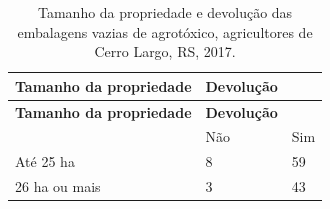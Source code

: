 \documentclass[12pt,brazil,oneside]{book}
\begin{document}
\begin{longtable}[]{@{}lll@{}}
\caption{\label{tab:tamprop1}Tamanho da propriedade e devolução das
embalagens vazias de agrotóxico, agricultores de Cerro Largo, RS,
2017.}\tabularnewline
\toprule
\begin{minipage}[b]{0.35\columnwidth}\raggedright
\textbf{Tamanho da propriedade}\strut
\end{minipage} & \begin{minipage}[b]{0.34\columnwidth}\raggedright
\textbf{Devolução}\strut
\end{minipage} & \begin{minipage}[b]{0.14\columnwidth}\raggedright
\strut
\end{minipage}\tabularnewline
\midrule
\endfirsthead
\toprule
\begin{minipage}[b]{0.35\columnwidth}\raggedright
\textbf{Tamanho da propriedade}\strut
\end{minipage} & \begin{minipage}[b]{0.34\columnwidth}\raggedright
\textbf{Devolução}\strut
\end{minipage} & \begin{minipage}[b]{0.14\columnwidth}\raggedright
\strut
\end{minipage}\tabularnewline
\midrule
\endhead
\begin{minipage}[t]{0.35\columnwidth}\raggedright
\strut
\end{minipage} & \begin{minipage}[t]{0.34\columnwidth}\raggedright
Não\strut
\end{minipage} & \begin{minipage}[t]{0.14\columnwidth}\raggedright
Sim\strut
\end{minipage}\tabularnewline
\begin{minipage}[t]{0.35\columnwidth}\raggedright
Até 25 ha\strut
\end{minipage} & \begin{minipage}[t]{0.34\columnwidth}\raggedright
8\strut
\end{minipage} & \begin{minipage}[t]{0.14\columnwidth}\raggedright
59\strut
\end{minipage}\tabularnewline
\begin{minipage}[t]{0.35\columnwidth}\raggedright
26 ha ou mais\strut
\end{minipage} & \begin{minipage}[t]{0.34\columnwidth}\raggedright
3\strut
\end{minipage} & \begin{minipage}[t]{0.14\columnwidth}\raggedright
43\strut
\end{minipage}\tabularnewline
\bottomrule
\end{longtable}
\end{document}
